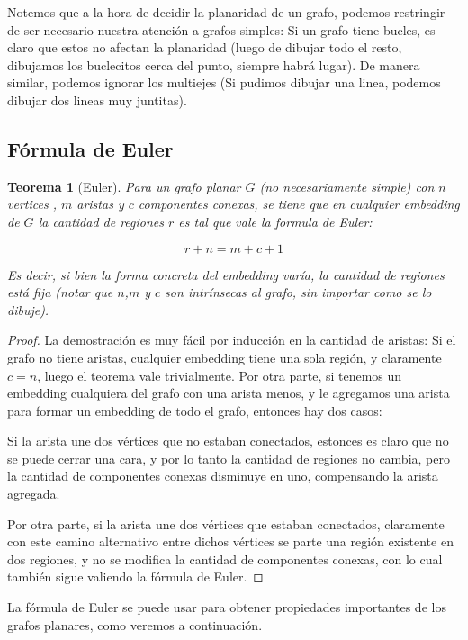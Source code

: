 \documentclass{article}
\newtheorem{teorema}{{\sc Teorema}}
\begin{document}
Notemos que a la hora de decidir la planaridad de un grafo, podemos restringir de ser necesario nuestra atención a grafos simples: Si un grafo tiene bucles,
es claro que estos no afectan la planaridad (luego de dibujar todo el resto, dibujamos los buclecitos cerca del punto, siempre habrá lugar).
De manera similar, podemos ignorar los multiejes (Si pudimos dibujar una linea, podemos dibujar dos lineas muy juntitas).

\subsection{Fórmula de Euler}

\begin{teorema}[Euler]
Para un grafo planar $G$ (no necesariamente simple) con $n$ vertices , $m$ aristas y $c$ componentes conexas, se tiene que en cualquier embedding
de $G$ la cantidad de regiones $r$ es tal que vale la formula de Euler:

$$r + n = m + c + 1$$

Es decir, si bien la forma concreta del embedding varía, la cantidad de regiones está fija (notar que $n$,$m$ y $c$ son intrínsecas al grafo,
sin importar como se lo dibuje).
\end{teorema}

\begin{proof}
La demostración es muy fácil por inducción en la cantidad de aristas: Si el grafo no tiene aristas, cualquier embedding tiene una sola región,
y claramente $c = n$, luego el teorema vale trivialmente. Por otra parte, si tenemos un embedding cualquiera del grafo con una arista menos,
y le agregamos una arista para formar un embedding de todo el grafo, entonces hay dos casos: 

Si la arista une dos vértices que no estaban
conectados, estonces es claro que no se puede cerrar una cara, y por lo tanto la cantidad de regiones no cambia, pero la cantidad de componentes
conexas disminuye en uno, compensando la arista agregada.

Por otra parte, si la arista une dos vértices que estaban conectados, claramente con este camino alternativo entre dichos vértices se parte
una región existente en dos regiones, y no se modifica la cantidad de componentes conexas, con lo cual también sigue valiendo la fórmula de Euler.

\end{proof}

La fórmula de Euler se puede usar para obtener propiedades importantes de los grafos planares, como veremos a continuación.
\end{document}
